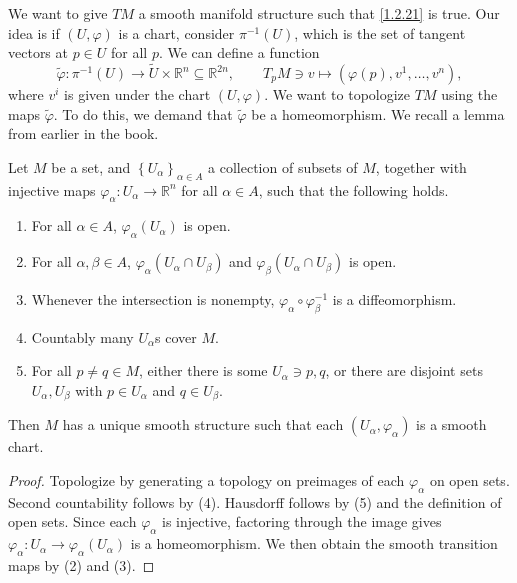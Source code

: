 
We want to give $TM$ a smooth manifold structure such that \cref{1.2.21} is true. Our idea is if $(U,\varphi )$ is a chart, consider $\pi ^{-1} (U)$, which is the set of tangent vectors at $p\in U$ for all $p$. We can define a function
\[
	\widetilde{\varphi } : \pi ^{-1} (U) \to \widetilde{U} \times \mathbb{R} ^n\subseteq \mathbb{R} ^{2n},\qquad T_pM\ni v\mapsto (\varphi (p),v^1, \ldots ,v^n),
\]
where $v^i$ is given under the chart $(U,\varphi )$. We want to topologize $TM$ using the maps $\widetilde{\varphi } $. To do this, we demand that $\widetilde{\varphi } $ be a homeomorphism. We recall a lemma from earlier in the book.

\begin{lemma}\label{1.2.22}
	Let $M$ be a set, and $\left\{ U_\alpha  \right\}_{\alpha \in A} $ a collection of subsets of $M$, together with injective maps $\varphi_\alpha : U_\alpha  \to \mathbb{R} ^n$ for all $\alpha \in A$, such that the following holds.

	\begin{enumerate}
		\item For all $\alpha \in A$, $\varphi_\alpha (U_\alpha )$ is open.
		\item For all $\alpha ,\beta \in A$, $\varphi _\alpha (U_\alpha \cap U_\beta )$ and $\varphi _\beta (U_\alpha \cap U_\beta )$ is open.
		\item Whenever the intersection is nonempty, $\varphi _\alpha \circ \varphi _\beta ^{-1} $ is a diffeomorphism.
		\item Countably many $U_\alpha $s cover $M$.
		\item For all $p\neq q\in M$, either there is some $U_\alpha \ni p,q$, or there are disjoint sets $U_\alpha ,U_\beta $ with $p\in U_\alpha $ and $q\in U_\beta $.
	\end{enumerate}
	Then $M$ has a unique smooth structure such that each $(U_\alpha ,\varphi_\alpha )$ is a smooth chart.
\end{lemma}
\begin{proof}
	Topologize by generating a topology on preimages of each $\varphi _\alpha $ on open sets. Second countability follows by (4). Hausdorff follows by (5) and the definition of open sets. Since each $\varphi _\alpha $ is injective, factoring through the image gives $\varphi _\alpha : U_\alpha  \to \varphi_\alpha (U_\alpha )$ is a homeomorphism. We then obtain the smooth transition maps by (2) and (3).
\end{proof}

